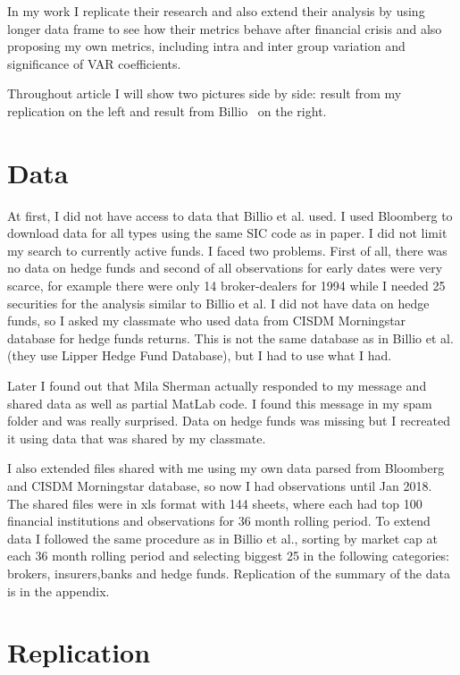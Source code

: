 \documentclass[preprint,pre,floats,aps,amsmath,amssymb]{revtex4}
\begin{document}
In my work I replicate their research and also extend their analysis by using longer data frame to see how their metrics behave after financial crisis and also  proposing my own metrics, including intra and inter group variation and  significance of VAR coefficients.

Throughout article I will show two pictures side by side: result from my replication on the left and result from Billio~\cite{billio} on the right. 


\section{Data}
\label{sec:data}
At first, I did not have access to data that Billio et al.  used. I used Bloomberg to download data for all types using the same SIC code as in paper. I did not limit my search to currently active funds. I faced two problems. First of all, there was no data on hedge funds and second of all observations for early dates were very scarce, for example there were only 14 broker-dealers for 1994 while I needed 25 securities for the analysis similar to Billio et al. 
\indent
I did not have data on hedge funds, so I asked my classmate who used data from CISDM Morningstar database for hedge funds returns. This is not the same database as in Billio et al. (they use Lipper Hedge Fund Database), but I had to use what I had. 

  
\indent
Later I found out that Mila Sherman actually responded to my message and shared data as well as partial MatLab code. I found this message in my spam folder and was really surprised. Data on hedge funds was missing but I recreated it using data that was shared by my classmate. 

\indent
I also extended files shared with me using my own data parsed from Bloomberg and CISDM Morningstar database, so now I had observations until Jan 2018. The shared files were in xls format with 144 sheets, where each had top 100 financial institutions and observations for 36 month rolling period. To extend data I followed the same procedure as in Billio et al., sorting by market cap at each 36 month rolling period and selecting biggest 25 in the following categories: brokers, insurers,banks and hedge funds. Replication of the summary of the data is in the appendix.






\section{Replication}
\label{sec:insample}
\end{document}
